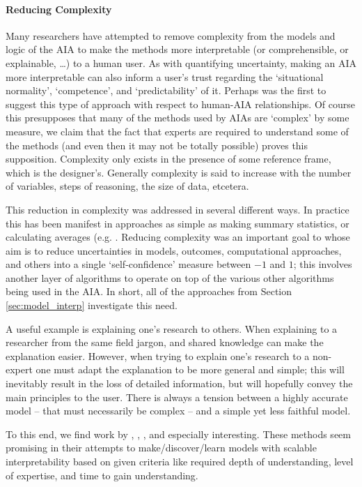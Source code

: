     \paragraph{Reducing Complexity} Many researchers have attempted to remove complexity from the models and logic of the AIA to make the methods more interpretable (or comprehensible, or explainable, \ldots) to a human user. As with quantifying uncertainty, making an AIA more interpretable can also inform a user's trust regarding the `situational normality', `competence', and `predictability' of it. Perhaps \cite{Sheridan1984-kx} was the first to suggest this type of approach with respect to human-AIA relationships. Of course this presupposes that many of the methods used by AIAs are `complex' by some measure, we claim that the fact that experts are required to understand some of the methods (and even then it may not be totally possible) proves this supposition. Complexity only exists in the presence of some reference frame, which is the designer's. Generally complexity is said to increase with the number of variables, steps of reasoning, the size of data, etcetera.

    This reduction in complexity was addressed in several different ways. In practice this has been manifest in approaches as simple as making summary statistics, or calculating averages (e.g. \cite{Muir1994-ow,Muir1996-gt}. Reducing complexity was an important goal to \cite{Aitken2016-fb} whose aim is to reduce uncertainties in models, outcomes, computational approaches, and others into a single `self-confidence' measure between $-1$ and $1$; this involves another layer of algorithms to operate on top of the various other algorithms being used in the AIA. In short, all of the approaches from Section \ref{sec:model_interp} investigate this need.

    A useful example is explaining one's research to others. When explaining to a researcher from the same field jargon, and shared knowledge can make the explanation easier. However, when trying to explain one's research to a non-expert one must adapt the explanation to be more general and simple; this will inevitably result in the loss of detailed information, but will hopefully convey the main principles to the user. There is always a tension between a highly accurate model -- that must necessarily be complex -- and a simple yet less faithful model. 

    To this end, we find work by \cite{Ruping2006-xj}, \cite{Van_Belle2012-dt}, \cite{Ribeiro2016-uc}, and \cite{Choi2016-by} especially interesting. These methods seem promising in their attempts to make/discover/learn models with scalable interpretability based on given criteria like required depth of understanding, level of expertise, and time to gain understanding. 
    

